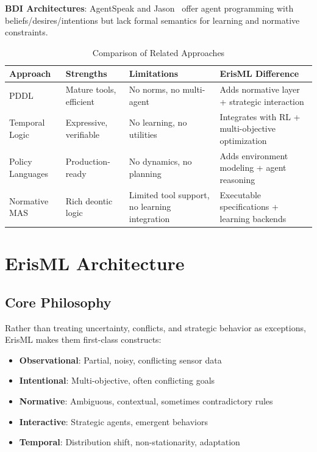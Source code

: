 \documentclass[conference]{IEEEtran}
\begin{document}
\textbf{BDI Architectures}: AgentSpeak and Jason~\cite{bordini2007} offer agent
programming with beliefs/desires/intentions but lack formal semantics
for learning and normative constraints.

\begin{table}[t]
\caption{Comparison of Related Approaches}
\label{tab:comparison}
\centering
\footnotesize
\begin{tabular}{@{}p{1.4cm}p{1.6cm}p{1.8cm}p{2.2cm}@{}}
\toprule
Approach & Strengths & Limitations & ErisML Difference \\
\midrule
PDDL & Mature tools, efficient & No norms, no multi-agent & Adds normative layer + strategic interaction \\
Temporal Logic & Expressive, verifiable & No learning, no utilities & Integrates with RL + multi-objective optimization \\
Policy Languages & Production-ready & No dynamics, no planning & Adds environment modeling + agent reasoning \\
Normative MAS & Rich deontic logic & Limited tool support, no learning integration & Executable specifications + learning backends \\
\bottomrule
\end{tabular}
\end{table}

\section{ErisML Architecture}
\label{sec:architecture}

\subsection{Core Philosophy}

Rather than treating uncertainty, conflicts, and strategic behavior as
exceptions, ErisML makes them first-class constructs:

\begin{itemize}
\item \textbf{Observational}: Partial, noisy, conflicting sensor data
\item \textbf{Intentional}: Multi-objective, often conflicting goals
\item \textbf{Normative}: Ambiguous, contextual, sometimes contradictory rules
\item \textbf{Interactive}: Strategic agents, emergent behaviors
\item \textbf{Temporal}: Distribution shift, non-stationarity, adaptation
\end{itemize}
\end{document}
